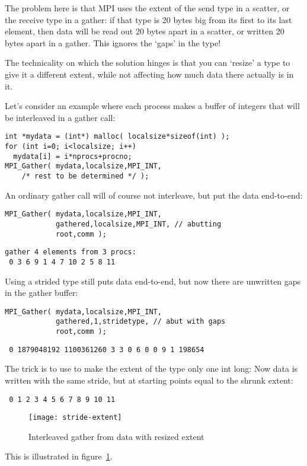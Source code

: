The problem here is that MPI uses the extent of the send type in a scatter,
or the receive type in a gather: if that type is 20 bytes big from
its first to its last element, then
data will be read out 20 bytes apart in a scatter, or written 20 bytes apart
in a gather. This ignores the `gaps' in the type!

The technicality on which the solution hinges is that you can `resize' a type
to give it a different extent, while not affecting how much data there
actually is in it.

Let's consider an example where each process makes a
buffer of integers that will be interleaved in a gather call:
\begin{lstlisting}
int *mydata = (int*) malloc( localsize*sizeof(int) );
for (int i=0; i<localsize; i++)
  mydata[i] = i*nprocs+procno;
MPI_Gather( mydata,localsize,MPI_INT,
    /* rest to be determined */ );
\end{lstlisting}

An ordinary gather call will of course not interleave, but
put the data end-to-end:
\begin{lstlisting}
MPI_Gather( mydata,localsize,MPI_INT,
            gathered,localsize,MPI_INT, // abutting
            root,comm );
\end{lstlisting}
\begin{verbatim}
gather 4 elements from 3 procs:
 0 3 6 9 1 4 7 10 2 5 8 11
\end{verbatim}

Using a strided type still puts data end-to-end, but now there
are unwritten gaps in the gather buffer:
\begin{lstlisting}
MPI_Gather( mydata,localsize,MPI_INT,
            gathered,1,stridetype, // abut with gaps
            root,comm );  
\end{lstlisting}
\begin{verbatim}
 0 1879048192 1100361260 3 3 0 6 0 0 9 1 198654
\end{verbatim}

The trick is to use 
to make the extent of the type only one int long:
%
%
Now data is written with the same stride, but
at starting points equal to the shrunk extent:
\begin{verbatim}
 0 1 2 3 4 5 6 7 8 9 10 11
\end{verbatim}

\begin{figure}[ht]
  \texttt{[image: stride-extent]}
  \caption{Interleaved gather from data with resized extent}
  \label{fig:stride-extent}
\end{figure}
This is illustrated in figure~\ref{fig:stride-extent}.

